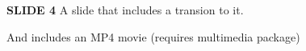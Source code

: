 \documentclass[11pt,vertical]{beamer}
\begin{document}
\begin{frame}{\small \textbf{SLIDE 4}}
    \transfade
    A slide that includes a transion to it.

    And includes an MP4 movie (requires \textcolor{HBRS}{multimedia} package)

    \bigskip
    \centering

\end{frame}



\end{document}
